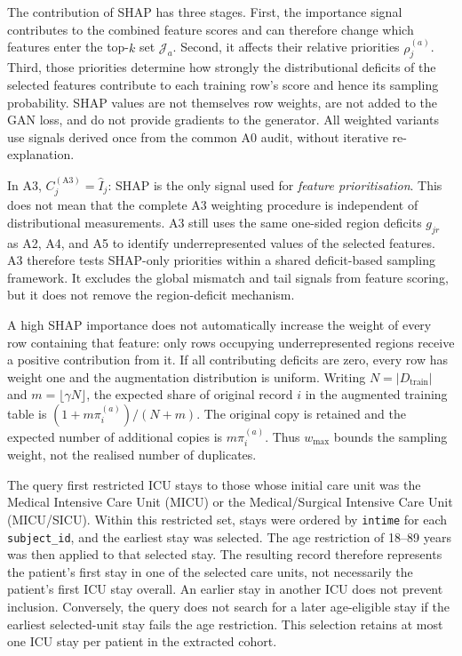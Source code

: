 The contribution of SHAP has three stages. First, the importance signal
contributes to the combined feature scores and can therefore change which
features enter the top-$k$ set $\mathcal{J}_a$. Second, it affects their
relative priorities $\rho_j^{(a)}$. Third, those priorities determine how
strongly the distributional deficits of the selected features contribute to
each training row's score and hence its sampling probability. SHAP values
are not themselves row weights, are not added to the GAN loss, and do not
provide gradients to the generator. All weighted variants use signals
derived once from the common A0 audit, without iterative re-explanation.

In A3, $C_j^{(\mathrm{A3})}=\widehat I_j$: SHAP is the only signal used for
\emph{feature prioritisation}. This does not mean that the complete A3
weighting procedure is independent of distributional measurements. A3 still
uses the same one-sided region deficits $g_{jr}$ as A2, A4, and A5 to
identify underrepresented values of the selected features. A3 therefore
tests SHAP-only priorities within a shared deficit-based sampling framework.
It excludes the global mismatch and tail signals from feature scoring,
but it does not remove the region-deficit mechanism.

A high SHAP importance does not automatically increase the weight of every
row containing that feature: only rows occupying underrepresented regions
receive a positive contribution from it. If all contributing deficits are
zero, every row has weight one and the augmentation distribution is uniform.
Writing $N=|D_{\mathrm{train}}|$ and $m=\lfloor\gamma N\rfloor$, the expected
share of original record $i$ in the augmented training table is
$(1+m\pi_i^{(a)})/(N+m)$. The original copy is retained and the expected
number of additional copies is $m\pi_i^{(a)}$. Thus $w_{\max}$ bounds the
sampling weight, not the realised number of duplicates.

The query first restricted ICU stays to those whose initial care unit was
the Medical Intensive Care Unit (MICU) or the Medical/Surgical Intensive
Care Unit (MICU/SICU). Within this restricted set, stays were ordered by
\texttt{intime} for each \texttt{subject\_id}, and the earliest stay was
selected. The age restriction of 18--89 years was then applied to that
selected stay. The resulting record therefore represents the patient's
first stay in one of the selected care units, not necessarily the patient's
first ICU stay overall. An earlier stay in another ICU does not prevent
inclusion. Conversely, the query does not search for a later age-eligible
stay if the earliest selected-unit stay fails the age restriction. This
selection retains at most one ICU stay per patient in the extracted cohort.

